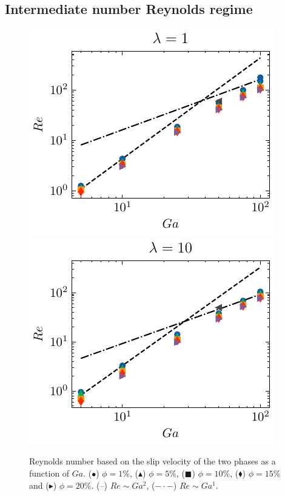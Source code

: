 









\subsection{Intermediate number Reynolds regime}


\begin{figure}
\centering
    \includegraphics[height = 0.35\textwidth]{image/HOMOGENEOUS/fCA/Re_N_5_l_1.pdf}
    \includegraphics[height = 0.35\textwidth]{image/HOMOGENEOUS/fCA/Re_N_5_l_10.pdf}
    \caption{Reynolds number based on the slip velocity of the two phases as a function of $Ga$. ($\bullet$) $\phi = 1\%$, ($\blacktriangle$) $\phi = 5\%$, ($\blacksquare$) $\phi = 10\%$, ($\blacklozenge$) $\phi = 15\%$ and ($\blacktriangleright$) $\phi = 20\%$. (--) $Re \sim Ga ^2$, ($-\cdot-$) $Re \sim Ga ^1$.}
    \label{fig:Re_Ga}
\end{figure}


